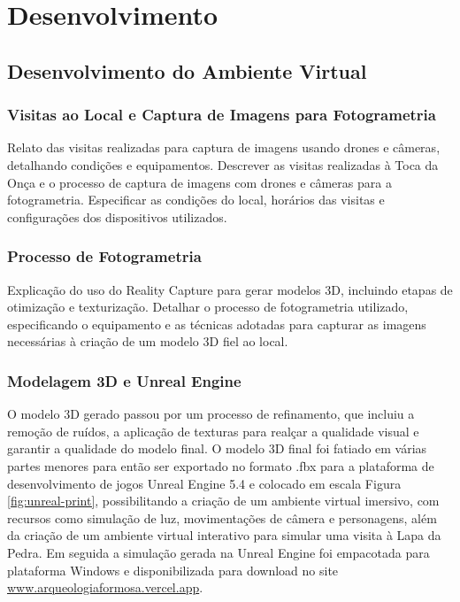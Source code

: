 \chapter{Desenvolvimento}
\label{cap:desenvolvimento}
\section{Desenvolvimento do Ambiente Virtual}
\label{sec:desenvolvimento_ambiente_virtual}
    \subsection{Visitas ao Local e Captura de Imagens para Fotogrametria}
    \label{sec:visitas_fotogrametria}
    Relato das visitas realizadas para captura de imagens usando drones e câmeras, detalhando condições e equipamentos.
    Descrever as visitas realizadas à Toca da Onça e o processo de captura de imagens com drones e câmeras para a fotogrametria. Especificar as condições do local, horários das visitas e configurações dos dispositivos utilizados.


    \subsection{Processo de Fotogrametria}
    \label{sec:processo_fotogrametria}
    Explicação do uso do Reality Capture para gerar modelos 3D, incluindo etapas de otimização e texturização.
    Detalhar o processo de fotogrametria utilizado, especificando o equipamento e as técnicas adotadas para capturar as imagens necessárias à criação de um modelo 3D fiel ao local.

    \subsection{Modelagem 3D e Unreal Engine}
    \label{sec:modelagem_unreal}
    O modelo 3D gerado passou por um processo de refinamento, que incluiu a remoção de ruídos, a aplicação de texturas para realçar a qualidade visual e garantir a qualidade do modelo final. O modelo 3D final foi fatiado em várias partes menores para então ser exportado no formato .fbx para a plataforma de desenvolvimento de jogos Unreal Engine 5.4 e colocado em escala Figura \ref{fig:unreal-print}, possibilitando a criação de um ambiente virtual imersivo, com recursos como simulação de luz, movimentações de câmera e personagens, além da criação de um ambiente virtual interativo para simular uma visita à Lapa da Pedra. Em seguida a simulação gerada na Unreal Engine foi empacotada para plataforma Windows e disponibilizada para download no site 
    \href{https://arqueologiaformosa.vercel.app/}{www.arqueologiaformosa.vercel.app}.
    
